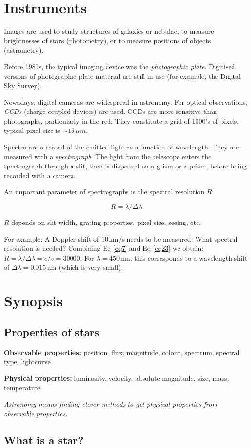 \section{Instruments}

Images are used to study structures of galaxies or nebulae, to measure brightnesses of stars (photometry), or to measure positions of objects (astrometry).

Before 1980s, the typical imaging device was the \textit{photographic plate}. Digitised versions of photographic plate material are still in use (for example, the Digital Sky Survey).

Nowadays, digital cameras are widespread in astronomy. For optical observations, \textit{CCDs} (charge-coupled devices) are used. CCDs are more sensitive than photographs, particularly in the red. They constitute a grid of 1000's of pixels, typical pixel size is $\sim 15\,\mu m$.

Spectra are a record of the emitted light as a function of wavelength. They are measured with a \textit{spectrograph}. The light from the telescope enters the spectrograph through a slit, then is dispersed on a grism or a prism, before being recorded with a camera.

An important parameter of spectrographs is the spectral resolution $R$:

\begin{equation}
R = \lambda / \Delta\lambda
\label{eq23}
\end{equation}

$R$ depends on slit width, grating properties, pixel size, seeing, etc. 

For example: A Doppler shift of 10\,km/s needs to be measured. What spectral resolution is needed? Combining Eq \ref{eq7} and Eq \ref{eq23} we obtain: $R = \lambda / \Delta\lambda = c / v  = 30000$. For $\lambda = 450$\,nm, this corresponds to a wavelength shift of $\Delta\lambda = 0.015$\,nm (which is very small).

\section{Synopsis}

\subsection{Properties of stars}

\textbf{Observable properties:} position, flux, magnitude, colour, spectrum, spectral type, lightcurve

\textbf{Physical properties:} luminosity, velocity, absolute magnitude, size, mass, temperature

\textit{Astronomy means finding clever methods to get physical properties from observable properties.}

\subsection{What is a star?}


